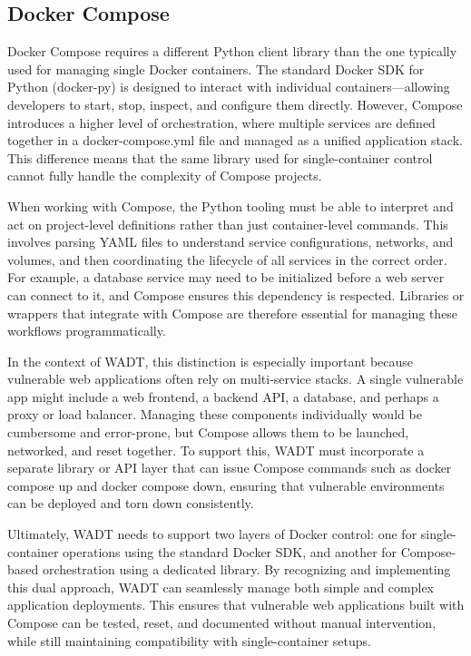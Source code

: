 \documentclass[12pt,titlepage]{article}
\begin{document}
\subsection{Docker Compose}
Docker Compose requires a different Python client library than the one typically used for managing single Docker containers. The standard Docker SDK for Python (docker-py) is designed to interact with individual containers—allowing developers to start, stop, inspect, and configure them directly. However, Compose introduces a higher level of orchestration, where multiple services are defined together in a docker-compose.yml file and managed as a unified application stack. This difference means that the same library used for single-container control cannot fully handle the complexity of Compose projects.

When working with Compose, the Python tooling must be able to interpret and act on project-level definitions rather than just container-level commands. This involves parsing YAML files to understand service configurations, networks, and volumes, and then coordinating the lifecycle of all services in the correct order. For example, a database service may need to be initialized before a web server can connect to it, and Compose ensures this dependency is respected. Libraries or wrappers that integrate with Compose are therefore essential for managing these workflows programmatically.

In the context of WADT, this distinction is especially important because vulnerable web applications often rely on multi-service stacks. A single vulnerable app might include a web frontend, a backend API, a database, and perhaps a proxy or load balancer. Managing these components individually would be cumbersome and error-prone, but Compose allows them to be launched, networked, and reset together. To support this, WADT must incorporate a separate library or API layer that can issue Compose commands such as docker compose up and docker compose down, ensuring that vulnerable environments can be deployed and torn down consistently.

Ultimately, WADT needs to support two layers of Docker control: one for single-container operations using the standard Docker SDK, and another for Compose-based orchestration using a dedicated library. By recognizing and implementing this dual approach, WADT can seamlessly manage both simple and complex application deployments. This ensures that vulnerable web applications built with Compose can be tested, reset, and documented without manual intervention, while still maintaining compatibility with single-container setups.
\end{document}
